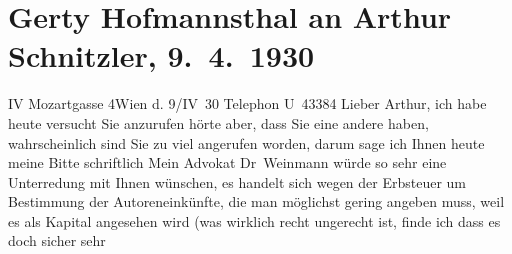 

         
         \renewcommand{\erwaehntePersonen}{Personen: Gertrude von Hofmannsthal, Raimund von Hofmannsthal, Hugo August von Hofmannsthal, Anna von Hofmannsthal, Hugo von Hofmannsthal, Franz Schalk, Olga Schnitzler, Heinrich Schnitzler, Leonhard Weinmann}
         \renewcommand{\erwaehnteOrte}{Orte: Berlin, Stallburggasse, Wien}
         \renewcommand{\erwaehnteWerke}{}
               \section[Gerty Hofmannsthal an Arthur Schnitzler, 9. 4. 1930]{ Gerty Hofmannsthal an Arthur Schnitzler, 9. 4. 1930}\nopagebreak{}\rehead{ }\begin{ledgroupsized}[t]{13cm}\normalsize\beginnumbering{} \toendnotes[C]{\smallbreak\pagebreak[2]} 
\toendnotes[C]{\smallbreak}\pstart
           \noindent{}{\pb}IV Mozartgasse 4\hfill Wien d. 9/IV 30\pend
           \pstart
           Telephon U 43384\pend
           \pstart
           Lieber Arthur, ich habe heute versucht Sie anzurufen hörte aber,
               dass Sie eine andere \label{K_L02535-1v}\label{K_L02535-1h} haben, wahrscheinlich sind Sie zu viel angerufen worden, darum sage ich Ihnen
               heute meine Bitte schriftlich\pend
           \pstart
           Mein Advokat Dr Weinmann würde so sehr eine
               Unterredung mit Ihnen wünschen, es handelt sich wegen der Erbsteuer um Bestimmung der
               Autoreneinkünfte, die man möglichst gering angeben muss, weil es als Kapital
               angesehen wird (was wirklich recht ungerecht ist, finde ich dass es doch sicher sehr

\end{ledgroupsized}
